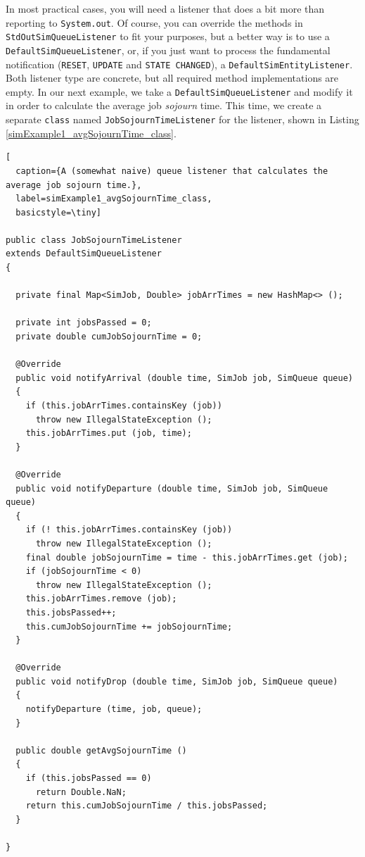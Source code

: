 \documentclass[12pt]{book}
\begin{document}
In most practical cases,
  you will need a listener that does a bit more than reporting to \lstinline|System.out|.
Of course, you can override the methods in \lstinline|StdOutSimQueueListener|
  to fit your purposes, but a better way is to use a \lstinline|DefaultSimQueueListener|,
  or, if you just want to process the fundamental notification (\lstinline|RESET|,
  \lstinline|UPDATE| and \lstinline|STATE CHANGED|),
  a \lstinline|DefaultSimEntityListener|.
Both listener type are concrete,
  but all required method implementations are empty.
In our next example,
  we take a \lstinline|DefaultSimQueueListener|
  and modify it in order to calculate the average
  job {\em sojourn\/} time.
This time,
  we create a separate \lstinline|class| named \lstinline|JobSojournTimeListener|
  for the listener,
  shown in Listing \ref{simExample1_avgSojournTime_class}.

\begin{lstlisting}[
  caption={A (somewhat naive) queue listener that calculates the average job sojourn time.},
  label=simExample1_avgSojournTime_class,
  basicstyle=\tiny]

public class JobSojournTimeListener
extends DefaultSimQueueListener
{

  private final Map<SimJob, Double> jobArrTimes = new HashMap<> ();

  private int jobsPassed = 0;
  private double cumJobSojournTime = 0;
  
  @Override
  public void notifyArrival (double time, SimJob job, SimQueue queue)
  {
    if (this.jobArrTimes.containsKey (job))
      throw new IllegalStateException ();
    this.jobArrTimes.put (job, time);
  }
  
  @Override
  public void notifyDeparture (double time, SimJob job, SimQueue queue)
  {
    if (! this.jobArrTimes.containsKey (job))
      throw new IllegalStateException ();
    final double jobSojournTime = time - this.jobArrTimes.get (job);
    if (jobSojournTime < 0)
      throw new IllegalStateException ();
    this.jobArrTimes.remove (job);
    this.jobsPassed++;
    this.cumJobSojournTime += jobSojournTime;
  }

  @Override
  public void notifyDrop (double time, SimJob job, SimQueue queue)
  {
    notifyDeparture (time, job, queue);
  }
  
  public double getAvgSojournTime ()
  {
    if (this.jobsPassed == 0)
      return Double.NaN;
    return this.cumJobSojournTime / this.jobsPassed;
  }
  
}

\end{lstlisting}
\end{document}
